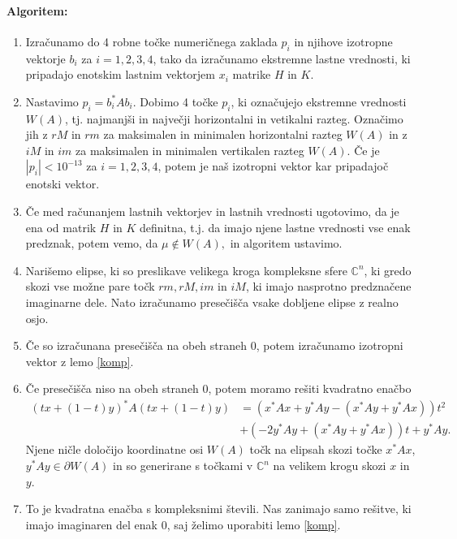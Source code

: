 \documentclass[12pt,a4paper]{amsart}
\theoremstyle{definition}
\theoremstyle{plain}
\newcommand{\C}{\mathbb C}
\begin{document}
\paragraph{Algoritem:}
\begin{enumerate}[1.]
\item Izračunamo do 4 robne točke numeričnega zaklada $p_i$ in njihove izotropne vektorje $b_i$ za $i=1,2,3,4$, tako da izračunamo ekstremne lastne vrednosti, ki pripadajo enotskim lastnim vektorjem $x_i$ %
matrike $H$ in $K$.
\item Nastavimo $p_i =b^\ast _i Ab_i$. Dobimo 4 točke $p_i$, ki označujejo ekstremne vrednosti $W(A)$, tj. najmanjši in največji horizontalni in vetikalni razteg. Označimo jih z $rM$ in $rm$ za maksimalen in minimalen horizontalni razteg $W(A)$ in z $iM$ in $im$ za maksimalen in minimalen vertikalen razteg $W(A)$. Če je $|p_i|<10^{-13}$ za $i=1,2,3,4$, potem je naš izotropni vektor kar pripadajoč enotski vektor.
\item Če med računanjem lastnih vektorjev in lastnih vrednosti ugotovimo, da je ena od matrik $H$ in $K$ definitna, t.j. da imajo njene lastne vrednosti vse enak predznak, potem vemo, da $\mu \not\in W(A),$ in algoritem ustavimo.
\item Narišemo elipse, ki so preslikave velikega kroga kompleksne sfere $\C^n$, ki gredo skozi vse možne pare točk $rm, rM, im$ in $iM$, ki imajo nasprotno predznačene imaginarne dele. Nato izračunamo presečišča vsake dobljene elipse z realno osjo.%
\item Če so izračunana presečišča na obeh straneh 0, potem izračunamo izotropni vektor z lemo \ref{komp}.
\item Če presečišča niso na obeh straneh 0, potem moramo rešiti kvadratno enačbo 
\begin{align}\label{eq:en3}
(tx +(1-t)y)^\ast A(tx+(1-t)y) & =(x^\ast Ax+y^\ast Ay -(x^\ast Ay +y^\ast Ax))t^2 \\
&+(-2y^\ast Ay +(x^\ast Ay+y^\ast Ax))t +y^\ast Ay.\nonumber
\end{align}
Njene ničle določijo koordinatne osi $W(A)$ točk na elipsah skozi točke $x^\ast Ax$, $y^\ast Ay\in \partial W(A)$ %
in so generirane s točkami v $\C^n$ na velikem krogu skozi $x$ in $y$. 
\item To je kvadratna enačba s kompleksnimi števili. Nas zanimajo samo rešitve, ki imajo imaginaren del enak 0, saj želimo uporabiti lemo \ref{komp}.

\end{enumerate}
\end{document}
